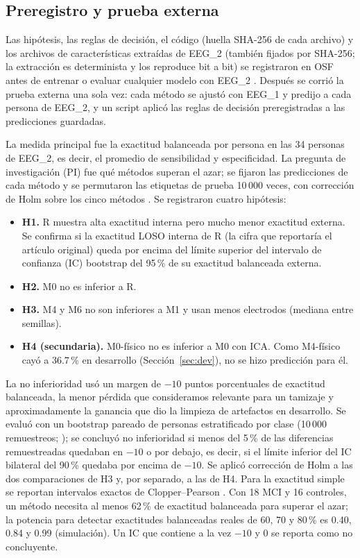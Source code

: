 \subsection{Preregistro y prueba externa}

Las hipótesis, las reglas de decisión, el código (huella SHA-256 de cada archivo) y los archivos de características extraídas de EEG\_2 (también fijados por SHA-256; la extracción es determinista y los reproduce bit a bit) se registraron en OSF antes de entrenar o evaluar cualquier modelo con EEG\_2 \citep{osfprereg}. Después se corrió la prueba externa una sola vez: cada método se ajustó con EEG\_1 y predijo a cada persona de EEG\_2, y un script aplicó las reglas de decisión preregistradas a las predicciones guardadas.

La medida principal fue la exactitud balanceada por persona en las 34 personas de EEG\_2, es decir, el promedio de sensibilidad y especificidad. La pregunta de investigación (PI) fue qué métodos superan el azar; se fijaron las predicciones de cada método y se permutaron las etiquetas de prueba 10\,000 veces, con corrección de Holm sobre los cinco métodos \citep{holm1979}. Se registraron cuatro hipótesis:
\begin{itemize}[leftmargin=*,itemsep=1pt]
\item \textbf{H1.} R muestra alta exactitud interna pero mucho menor exactitud externa. Se confirma si la exactitud LOSO interna de R (la cifra que reportaría el artículo original) queda por encima del límite superior del intervalo de confianza (IC) bootstrap del 95\,\% de su exactitud balanceada externa.
\item \textbf{H2.} M0 no es inferior a R.
\item \textbf{H3.} M4 y M6 no son inferiores a M1 y usan menos electrodos (mediana entre semillas).
\item \textbf{H4 (secundaria).} M0-físico no es inferior a M0 con ICA. Como M4-físico cayó a 36.7\,\% en desarrollo (Sección~\ref{sec:dev}), no se hizo predicción para él.
\end{itemize}
La no inferioridad \citep{walker2011} usó un margen de $-10$ puntos porcentuales de exactitud balanceada, la menor pérdida que consideramos relevante para un tamizaje y aproximadamente la ganancia que dio la limpieza de artefactos en desarrollo. Se evaluó con un bootstrap pareado de personas estratificado por clase (10\,000 remuestreos; \citealp{efron1993}); se concluyó no inferioridad si menos del 5\,\% de las diferencias remuestreadas quedaban en $-10$ o por debajo, es decir, si el límite inferior del IC bilateral del 90\,\% quedaba por encima de $-10$. Se aplicó corrección de Holm a las dos comparaciones de H3 y, por separado, a las de H4. Para la exactitud simple se reportan intervalos exactos de Clopper--Pearson \citep{clopper1934}. Con 18 MCI y 16 controles, un método necesita al menos 62\,\% de exactitud balanceada para superar el azar; la potencia para detectar exactitudes balanceadas reales de 60, 70 y 80\,\% es 0.40, 0.84 y 0.99 (simulación). Un IC que contiene a la vez $-10$ y 0 se reporta como no concluyente.

